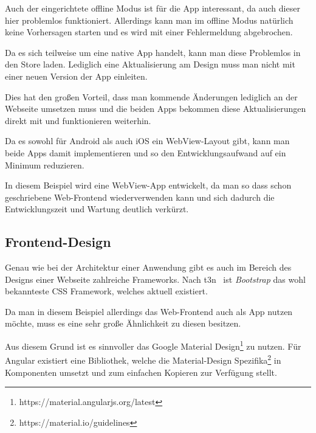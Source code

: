 Auch der eingerichtete offline Modus ist für die App interessant, da auch dieser hier problemlos funktioniert.
Allerdings kann man im offline Modus natürlich keine Vorhersagen starten und es wird mit einer Fehlermeldung
abgebrochen.

Da es sich teilweise um eine native App handelt, kann man diese Problemlos in den Store laden. Lediglich eine
Aktualisierung am Design muss man nicht mit einer neuen Version der App einleiten.

Dies hat den großen Vorteil, dass man kommende Änderungen lediglich an der Webseite umsetzen muss und die beiden Apps
bekommen diese Aktualisierungen direkt mit und funktionieren weiterhin.

Da es sowohl für Android als auch iOS ein WebView-Layout gibt, kann man beide Apps damit implementieren und so den
Entwicklungsaufwand auf ein Minimum reduzieren.

In diesem Beispiel wird eine WebView-App entwickelt, da man so dass schon geschriebene Web-Frontend wiederverwenden
kann und sich dadurch die Entwicklungszeit und Wartung deutlich verkürzt.

\subsection{Frontend-Design}
Genau wie bei der Architektur einer Anwendung gibt es auch im Bereich des Designs einer Webseite zahlreiche Frameworks.
Nach t3n~\cite{online_analyse_css} ist \textit{Bootstrap} das wohl bekannteste CSS Framework, welches aktuell existiert.

Da man in diesem Beispiel allerdings das Web-Frontend auch als App nutzen möchte, muss es eine sehr große Ähnlichkeit zu
diesen besitzen.

Aus diesem Grund ist es sinnvoller das Google Material Design\footnote{https://material.angularjs.org/latest} zu nutzen.
Für Angular existiert eine Bibliothek, welche die Material-Design Spezifika\footnote{https://material.io/guidelines} in
Komponenten umsetzt und zum einfachen Kopieren zur Verfügung stellt.